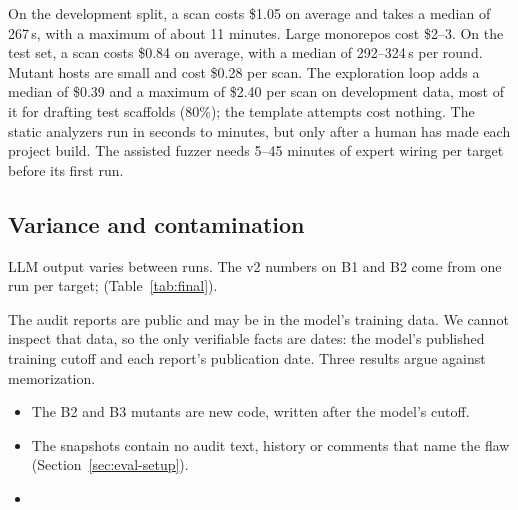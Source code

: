 On the development split, a scan costs \$1.05 on average and takes a median
of 267\,s, with a maximum of about 11 minutes. Large monorepos cost \$2--3.
On the test set, a scan costs \$0.84 on average, with a median of
292--324\,s per round. Mutant hosts are small and cost \$0.28 per scan.
The exploration loop adds a median of \$0.39 and a maximum of \$2.40 per scan
on development data, most of it for drafting test scaffolds (80\%); the
template attempts cost nothing.
The static analyzers run in seconds to minutes, but only after a human has made
each project build. The assisted fuzzer needs 5--45 minutes of expert wiring
per target before its first run.

\subsection{Variance and contamination}\label{sec:eval-validity}

LLM output varies between runs.
The v2 numbers on B1 and B2 come from one run per target;  (Table~\ref{tab:final}).

The audit reports are public and may be in the model's training data. We
cannot inspect that data, so the only verifiable facts are dates: the
model's published training cutoff and each report's publication date. Three
results argue against memorization.
\begin{itemize}
\item The B2 and B3 mutants are new code, written after the model's cutoff.
\item The snapshots contain no audit text, history or comments that name the
flaw (Section~\ref{sec:eval-setup}).
\item {}
\end{itemize}

